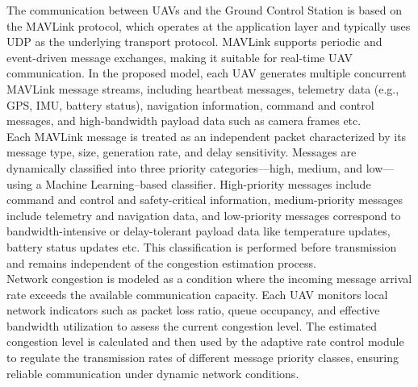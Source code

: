 \documentclass[pdflatex,sn-mathphys-num]{sn-jnl}%
\theoremstyle{thmstyleone}%
\theoremstyle{thmstyletwo}%
\theoremstyle{thmstylethree}%
\begin{document}
The communication between UAVs and the Ground Control Station is based on the MAVLink protocol, which operates at the application layer and typically uses UDP as the underlying transport protocol. MAVLink supports periodic and event-driven message exchanges, making it suitable for real-time UAV communication. In the proposed model, each UAV generates multiple concurrent MAVLink message streams, including heartbeat messages, telemetry data (e.g., GPS, IMU, battery status), navigation information, command and control messages, and high-bandwidth payload data such as camera frames etc.\\


Each MAVLink message is treated as an independent packet characterized by its message type, size, generation rate, and delay sensitivity. Messages are dynamically classified into three priority categories—high, medium, and low—using a Machine Learning–based classifier. High-priority messages include command and control and safety-critical information, medium-priority messages include telemetry and navigation data, and low-priority messages correspond to bandwidth-intensive or delay-tolerant payload data like temperature updates, battery status updates etc. This classification is performed before transmission and remains independent of the congestion estimation process.\\

Network congestion is modeled as a condition where the incoming message arrival rate exceeds the available communication capacity. Each UAV monitors local network indicators such as packet loss ratio, queue occupancy, and effective bandwidth utilization to assess the current congestion level. The estimated congestion level is calculated and then used by the adaptive rate control module to regulate the transmission rates of different message priority classes, ensuring reliable communication under dynamic network conditions.
\end{document}
